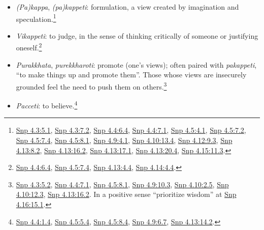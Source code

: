 \documentclass[12pt,openany]{book}%
\begin{document}
\begin{itemize}
\item \textit{(Pa)kappa}, \textit{(pa)kappeti}: formulation, a view created by imagination and speculation.\footnote{\href{https://suttacentral.net/snp4.3/en/sujato\#5.1}{Snp 4.3:5.1}, \href{https://suttacentral.net/snp4.3/en/sujato\#7.2}{Snp 4.3:7.2}, \href{https://suttacentral.net/snp4.4/en/sujato\#6.4}{Snp 4.4:6.4}, \href{https://suttacentral.net/snp4.4/en/sujato\#7.1}{Snp 4.4:7.1}, \href{https://suttacentral.net/snp4.5/en/sujato\#4.1}{Snp 4.5:4.1}, \href{https://suttacentral.net/snp4.5/en/sujato\#7.2}{Snp 4.5:7.2}, \href{https://suttacentral.net/snp4.5/en/sujato\#7.4}{Snp 4.5:7.4}, \href{https://suttacentral.net/snp4.5/en/sujato\#8.1}{Snp 4.5:8.1}, \href{https://suttacentral.net/snp4.9/en/sujato\#4.1}{Snp 4.9:4.1}, \href{https://suttacentral.net/snp4.10/en/sujato\#13.4}{Snp 4.10:13.4}, \href{https://suttacentral.net/snp4.12/en/sujato\#9.3}{Snp 4.12:9.3}, \href{https://suttacentral.net/snp4.13/en/sujato\#8.2}{Snp 4.13:8.2}, \href{https://suttacentral.net/snp4.13/en/sujato\#16.2}{Snp 4.13:16.2}, \href{https://suttacentral.net/snp4.13/en/sujato\#17.1}{Snp 4.13:17.1}, \href{https://suttacentral.net/snp4.13/en/sujato\#20.4}{Snp 4.13:20.4}, \href{https://suttacentral.net/snp4.15/en/sujato\#11.3}{Snp 4.15:11.3}. }%
\item \textit{Vikappeti}: to judge, in the sense of thinking critically of someone or justifying oneself.\footnote{\href{https://suttacentral.net/snp4.4/en/sujato\#6.4}{Snp 4.4:6.4}, \href{https://suttacentral.net/snp4.5/en/sujato\#7.4}{Snp 4.5:7.4}, \href{https://suttacentral.net/snp4.13/en/sujato\#4.4}{Snp 4.13:4.4}, \href{https://suttacentral.net/snp4.14/en/sujato\#4.4}{Snp 4.14:4.4}. }%
\item \textit{Purakkhata}, \textit{purekkharoti}: promote (one’s views); often paired with \textit{pakappeti}, “to make things up and promote them”. Those whose views are insecurely grounded feel the need to push them on others.\footnote{\href{https://suttacentral.net/snp4.3/en/sujato\#5.2}{Snp 4.3:5.2}, \href{https://suttacentral.net/snp4.4/en/sujato\#7.1}{Snp 4.4:7.1}, \href{https://suttacentral.net/snp4.5/en/sujato\#8.1}{Snp 4.5:8.1}, \href{https://suttacentral.net/snp4.9/en/sujato\#10.3}{Snp 4.9:10.3}, \href{https://suttacentral.net/snp4.10/en/sujato\#2.5}{Snp 4.10:2.5}, \href{https://suttacentral.net/snp4.10/en/sujato\#12.3}{Snp 4.10:12.3}, \href{https://suttacentral.net/snp4.13/en/sujato\#16.2}{Snp 4.13:16.2}. In a positive sense “prioritize wisdom” at \href{https://suttacentral.net/snp4.16/en/sujato\#15.1}{Snp 4.16:15.1}. }%
\item \textit{Pacceti}: to believe.\footnote{\href{https://suttacentral.net/snp4.4/en/sujato\#1.4}{Snp 4.4:1.4}, \href{https://suttacentral.net/snp4.5/en/sujato\#5.4}{Snp 4.5:5.4}, \href{https://suttacentral.net/snp4.5/en/sujato\#8.4}{Snp 4.5:8.4}, \href{https://suttacentral.net/snp4.9/en/sujato\#6.7}{Snp 4.9:6.7}, \href{https://suttacentral.net/snp4.13/en/sujato\#14.2}{Snp 4.13:14.2}. }%

\end{itemize}
\end{document}
